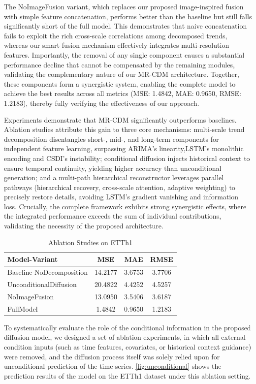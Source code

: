 The NoImageFusion variant, which replaces our proposed image-inspired fusion with simple feature concatenation, performs better than the baseline but still falls significantly short of the full model. This demonstrates that naive concatenation fails to exploit the rich cross-scale correlations among decomposed trends, whereas our smart fusion mechanism effectively integrates multi-resolution features. Importantly, the removal of any single component causes a substantial performance decline that cannot be compensated by the remaining modules, validating the complementary nature of our MR-CDM architecture. Together, these components form a synergistic system, enabling the complete model to achieve the best results across all metrics (MSE: 1.4842, MAE: 0.9650, RMSE: 1.2183), thereby fully verifying the effectiveness of our approach.

Experiments demonstrate that MR-CDM significantly outperforms baselines. Ablation studies attribute this gain to three core mechanisms: multi-scale trend decomposition disentangles short-, mid-, and long-term components for independent feature learning, surpassing ARIMA's linearity,LSTM's monolithic encoding and CSDI's instability; conditional diffusion injects historical context to ensure temporal continuity, yielding higher accuracy than unconditional generation; and a multi-path hierarchical reconstructor leverages parallel pathways (hierarchical recovery, cross-scale attention, adaptive weighting) to precisely restore details, avoiding LSTM's gradient vanishing and information loss. Crucially, the complete framework exhibits strong synergistic effects, where the integrated performance exceeds the sum of individual contributions, validating the necessity of the proposed architecture.
\begin{table}[h]
\centering
\caption{Ablation Studies on ETTh1}
\label{tab:ablation}
\begin{tabular}{lccc}
\hline
Model-Variant & MSE & MAE & RMSE \\ \hline
Baseline-NoDecomposition & {14.2177} & {3.6753} & {3.7706} \\
UnconditionalDiffusion & {20.4822} & {4.4252} & {4.5257} \\
NoImageFusion & {13.0950} & {3.5406} & {3.6187}\\
FullModel & {1.4842} & {0.9650} & {1.2183}\\
\hline
\end{tabular}
\end{table}

To systematically evaluate the role of the conditional information in the proposed diffusion model, we designed a set of ablation experiments, in which all external condition inputs (such as time features, covariates, or historical context guidance) were removed, and the diffusion process itself was solely relied upon for unconditional prediction of the time series. \autoref{fig:unconditional} shows the prediction results of the model on the ETTh1 dataset under this ablation setting. 


